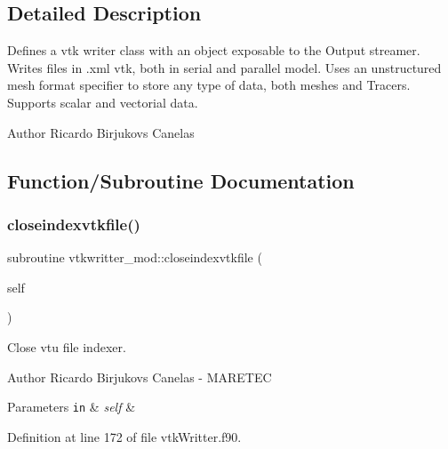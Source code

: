 \subsection{Detailed Description}
Defines a vtk writer class with an object exposable to the Output streamer. Writes files in .xml vtk, both in serial and parallel model. Uses an unstructured mesh format specifier to store any type of data, both meshes and Tracers. Supports scalar and vectorial data. 

\begin{DoxyAuthor}{Author}
Ricardo Birjukovs Canelas 
\end{DoxyAuthor}


\subsection{Function/\+Subroutine Documentation}
\mbox{\label{namespacevtkwritter__mod_a6f9a731d9dee5651f85d4aeed3f3ea5d}} 
\subsubsection{\texorpdfstring{closeindexvtkfile()}{closeindexvtkfile()}}
{\footnotesize\ttfamily subroutine vtkwritter\+\_\+mod\+::closeindexvtkfile (\begin{DoxyParamCaption}\item[{class(\mbox{\hyperlink{structvtkwritter__mod_1_1vtkwritter__class}{vtkwritter\+\_\+class}}), intent(inout)}]{self }\end{DoxyParamCaption})\hspace{0.3cm}{\ttfamily [private]}}



Close vtu file indexer. 

\begin{DoxyAuthor}{Author}
Ricardo Birjukovs Canelas -\/ M\+A\+R\+E\+T\+EC 
\end{DoxyAuthor}

\begin{DoxyParams}[1]{Parameters}
\mbox{\tt in}  & {\em self} & \\
\hline
\end{DoxyParams}


Definition at line 172 of file vtk\+Writter.\+f90.


